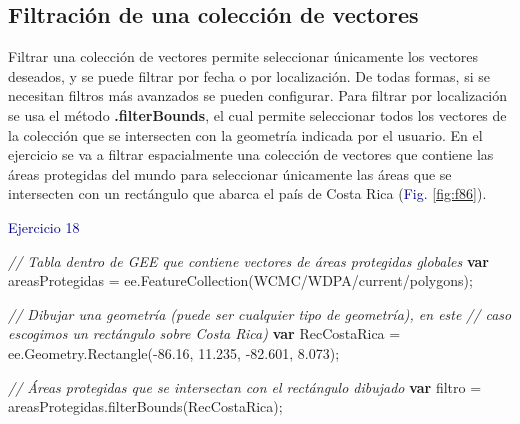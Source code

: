 \documentclass[
  12pt,
  letterpaper,
  twoside]{book}
\newenvironment{Shaded}{\begin{snugshade}}{\end{snugshade}}
\newcommand{\AttributeTok}[1]{\textcolor[rgb]{0.48,0.12,0.64}{#1}}
\newcommand{\CommentTok}[1]{\textcolor[rgb]{0.24,0.58,0.00}{\textit{#1}}}
\newcommand{\ControlFlowTok}[1]{\textcolor[rgb]{0.00,0.00,0.00}{\textbf{#1}}}
\newcommand{\FloatTok}[1]{\textcolor[rgb]{0.28,0.53,0.93}{#1}}
\newcommand{\FunctionTok}[1]{\textcolor[rgb]{0.48,0.12,0.64}{#1}}
\newcommand{\KeywordTok}[1]{\textcolor[rgb]{0.48,0.12,0.64}{#1}}
\newcommand{\NormalTok}[1]{#1}
\newcommand{\OperatorTok}[1]{\textcolor[rgb]{0.00,0.00,0.00}{#1}}
\newcommand{\StringTok}[1]{\textcolor[rgb]{0.87,0.29,0.22}{#1}}
\newcommand\boldpurple[1]{\textcolor{darkpurple}{\textbf{#1}}}
\begin{document}
\hypertarget{filtraciuxf3n-de-una-colecciuxf3n-de-vectores}{%
\subsection*{Filtración de una colección de vectores}\label{filtraciuxf3n-de-una-colecciuxf3n-de-vectores}}

Filtrar una colección de vectores permite seleccionar únicamente los vectores deseados, y se puede filtrar por fecha o por localización. De todas formas, si se necesitan filtros más avanzados se pueden configurar. Para filtrar por localización se usa el método \boldpurple{.filterBounds}, el cual permite seleccionar todos los vectores de la colección que se intersecten con la geometría indicada por el usuario. En el ejercicio se va a filtrar espacialmente una colección de vectores que contiene las áreas protegidas del mundo para seleccionar únicamente las áreas que se intersecten con un rectángulo que abarca el país de Costa Rica (\textcolor{darkblue}{Fig.} \ref{fig:f86}).

\textcolor{darkblue}{Ejercicio 18}

\begin{Shaded}
\begin{Highlighting}[]
\CommentTok{// Tabla dentro de GEE que contiene vectores de áreas protegidas globales}
\ControlFlowTok{var}\NormalTok{ areasProtegidas }\OperatorTok{=} \KeywordTok{ee}\OperatorTok{.}\FunctionTok{FeatureCollection}\NormalTok{(}\StringTok{\textquotesingle{}WCMC/WDPA/current/polygons\textquotesingle{}}\NormalTok{)}\OperatorTok{;} 

\CommentTok{// Dibujar una geometría (puede ser cualquier tipo de geometría), en este}
\CommentTok{// caso escogimos un rectángulo sobre Costa Rica)}
\ControlFlowTok{var}\NormalTok{ RecCostaRica }\OperatorTok{=} \KeywordTok{ee}\OperatorTok{.}\AttributeTok{Geometry}\OperatorTok{.}\FunctionTok{Rectangle}\NormalTok{(}\OperatorTok{{-}}\FloatTok{86.16}\OperatorTok{,} \FloatTok{11.235}\OperatorTok{,} \OperatorTok{{-}}\FloatTok{82.601}\OperatorTok{,} \FloatTok{8.073}\NormalTok{)}\OperatorTok{;}

\CommentTok{// Áreas protegidas que se intersectan con el rectángulo dibujado}
\ControlFlowTok{var}\NormalTok{ filtro }\OperatorTok{=}\NormalTok{ areasProtegidas}\OperatorTok{.}\FunctionTok{filterBounds}\NormalTok{(RecCostaRica)}\OperatorTok{;}
\end{Highlighting}
\end{Shaded}
\end{document}
